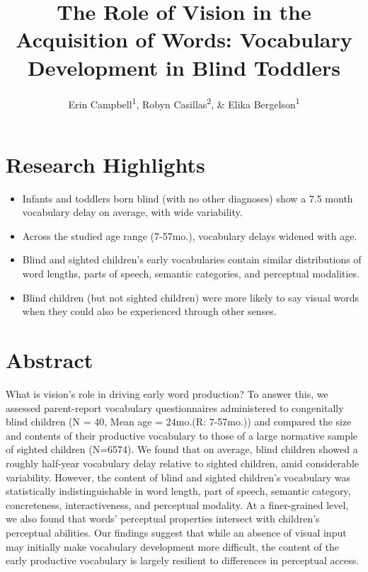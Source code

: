 \documentclass[
  man,floatsintext]{apa6}
\title{The Role of Vision in the Acquisition of Words: Vocabulary Development in Blind Toddlers}
\author{Erin Campbell\textsuperscript{1}, Robyn Casillas\textsuperscript{2}, \& Elika Bergelson\textsuperscript{1}}
\date{}
\affiliation{\vspace{0.5cm}\textsuperscript{1} Duke University\\\textsuperscript{2} Independent Researcher}
\providecommand{\tightlist}{%
  \setlength{\itemsep}{0pt}\setlength{\parskip}{0pt}}
\begin{document}
\maketitle

\hypertarget{research-highlights}{%
\section{Research Highlights}\label{research-highlights}}

\begin{itemize}
\tightlist
\item
  Infants and toddlers born blind (with no other diagnoses) show a 7.5 month vocabulary delay on average, with wide variability.
\item
  Across the studied age range (7-57mo.), vocabulary delays widened with age.
\item
  Blind and sighted children's early vocabularies contain similar distributions of word lengths, parts of speech, semantic categories, and perceptual modalities.
\item
  Blind children (but not sighted children) were more likely to say visual words when they could also be experienced through other senses.
\end{itemize}

\hypertarget{abstract}{%
\section{Abstract}\label{abstract}}

What is vision's role in driving early word production? To answer this, we assessed parent-report vocabulary questionnaires administered to congenitally blind children (N = 40, Mean age = 24mo.(R: 7-57mo.)) and compared the size and contents of their productive vocabulary to those of a large normative sample of sighted children (N=6574). We found that on average, blind children showed a roughly half-year vocabulary delay relative to sighted children, amid considerable variability. However, the content of blind and sighted children's vocabulary was statistically indistinguishable in word length, part of speech, semantic category, concreteness, interactiveness, and perceptual modality. At a finer-grained level, we also found that words' perceptual properties intersect with children's perceptual abilities. Our findings suggest that while an absence of visual input may initially make vocabulary development more difficult, the content of the early productive vocabulary is largely resilient to differences in perceptual access.
\end{document}
